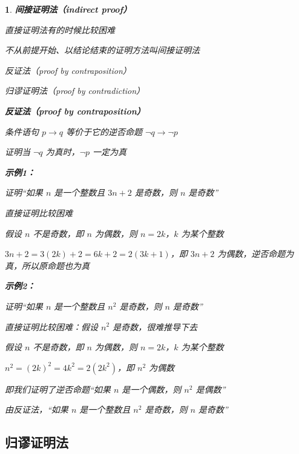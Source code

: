 \documentclass[UTF8]{report}
\theoremstyle{MyLineTheoremStyle} %
\theoremstyle{MyBlockTheoremStyle} %
\theoremstyle{MySubsubsectionStyle} %
\newtheorem{definition}{}
\begin{document}
\begin{definition}
    \textbf{间接证明法（indirect proof）}\par
    直接证明法有的时候比较困难\par
    不从前提开始、以结论结束的证明方法叫间接证明法\par
    \vspace{1em} %
    反证法（proof by contraposition）\par
    归谬证明法（proof by contradiction）\par
\vspace{1em} %
    \textbf{反证法（proof by contraposition）}\par
    条件语句 $p \rightarrow q$ 等价于它的逆否命题 $\neg q \rightarrow \neg p$\par
    证明当 $\neg q$ 为真时，$\neg p$ 一定为真\par
\vspace{1em} %
    \textbf{示例1：}\par
    证明“如果 $n$ 是一个整数且 $3n + 2$ 是奇数，则 $n$ 是奇数”\par
    直接证明比较困难\par
    假设 $n$ 不是奇数，即 $n$ 为偶数，则 $n = 2k$，$k$ 为某个整数\par
    $3n + 2 = 3(2k) + 2 = 6k + 2 = 2(3k + 1)$，即 $3n + 2$ 为偶数，逆否命题为真，所以原命题也为真\par
\vspace{1em} %
    \textbf{示例2：}\par
    证明“如果 $n$ 是一个整数且 $n^2$ 是奇数，则 $n$ 是奇数”\par
    直接证明比较困难：假设 $n^2$ 是奇数，很难推导下去\par
    假设 $n$ 不是奇数，即 $n$ 为偶数，则 $n = 2k$，$k$ 为某个整数\par
    $n^2 = (2k)^2 = 4k^2 = 2(2k^2)$，即 $n^2$ 为偶数\par
    即我们证明了逆否命题“如果 $n$ 是一个偶数，则 $n^2$ 是偶数”\par
    由反证法，“如果 $n$ 是一个整数且 $n^2$ 是奇数，则 $n$ 是奇数”\par
\end{definition}

\subsection{归谬证明法}
\end{document}
